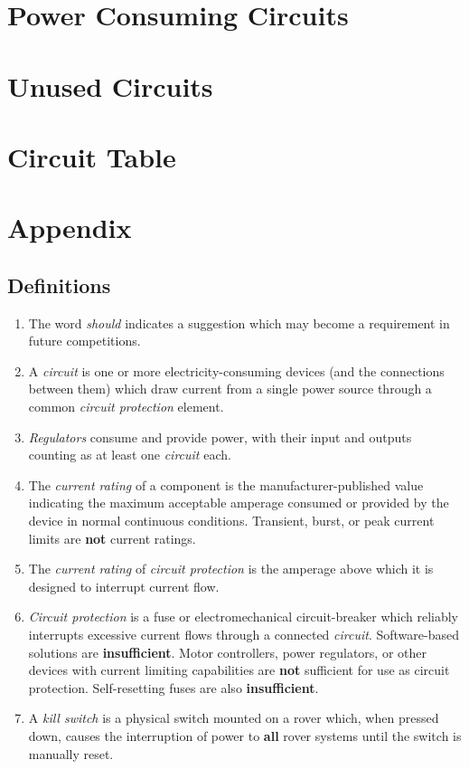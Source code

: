 \section{Power Consuming Circuits}

\section{Unused Circuits}

\section{Circuit Table}

\section{Appendix}

    \subsection{Definitions}

    \begin{enumerate}
        \item The word \textit{should} indicates a suggestion which may become a requirement in future competitions.
        \item A \textit{circuit} is one or more electricity-consuming devices (and the connections between them) which draw current from a single power source through a common \textit{circuit protection} element.
        \item \textit{Regulators} consume and provide power, with their input and outputs counting as at least one \textit{circuit} each.
        \item The \textit{current rating} of a component is the manufacturer-published value indicating the maximum acceptable amperage consumed or provided by the device in normal continuous conditions. Transient, burst, or peak current limits are \textbf{not} current ratings.
        \item The \textit{current rating} of \textit{circuit protection} is the amperage above which it is designed to interrupt current flow.
        \item \textit{Circuit protection} is a fuse or electromechanical circuit-breaker which reliably interrupts excessive current flows through a connected \textit{circuit}. Software-based solutions are \textbf{insufficient}. Motor controllers, power regulators, or other devices with current limiting capabilities are \textbf{not} sufficient for use as circuit protection. Self-resetting fuses are also \textbf{insufficient}.
        \item A \textit{kill switch} is a physical switch mounted on a rover which, when pressed down, causes the interruption of power to \textbf{all} rover systems until the switch is manually reset.
    \end{enumerate}

